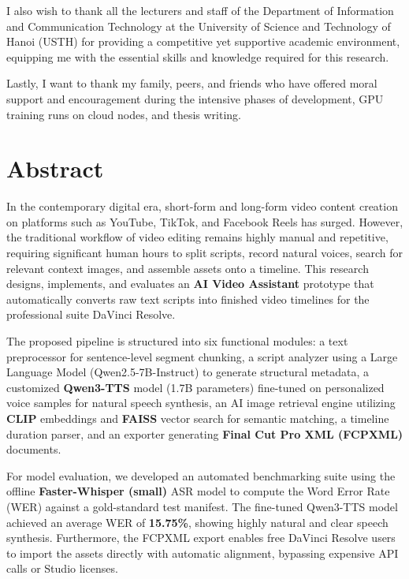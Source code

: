 \documentclass[a4paper,12pt]{report}
\begin{document}
I also wish to thank all the lecturers and staff of the Department of Information and Communication Technology at the University of Science and Technology of Hanoi (USTH) for providing a competitive yet supportive academic environment, equipping me with the essential skills and knowledge required for this research.

Lastly, I want to thank my family, peers, and friends who have offered moral support and encouragement during the intensive phases of development, GPU training runs on cloud nodes, and thesis writing.
\newpage

\chapter*{Abstract}
In the contemporary digital era, short-form and long-form video content creation on platforms such as YouTube, TikTok, and Facebook Reels has surged. However, the traditional workflow of video editing remains highly manual and repetitive, requiring significant human hours to split scripts, record natural voices, search for relevant context images, and assemble assets onto a timeline. This research designs, implements, and evaluates an \textbf{AI Video Assistant} prototype that automatically converts raw text scripts into finished video timelines for the professional suite DaVinci Resolve.

The proposed pipeline is structured into six functional modules: a text preprocessor for sentence-level segment chunking, a script analyzer using a Large Language Model (Qwen2.5-7B-Instruct) to generate structural metadata, a customized \textbf{Qwen3-TTS} model (1.7B parameters) fine-tuned on personalized voice samples for natural speech synthesis, an AI image retrieval engine utilizing \textbf{CLIP} embeddings and \textbf{FAISS} vector search for semantic matching, a timeline duration parser, and an exporter generating \textbf{Final Cut Pro XML (FCPXML)} documents. 

For model evaluation, we developed an automated benchmarking suite using the offline \textbf{Faster-Whisper (small)} ASR model to compute the Word Error Rate (WER) against a gold-standard test manifest. The fine-tuned Qwen3-TTS model achieved an average WER of \textbf{15.75\%}, showing highly natural and clear speech synthesis. Furthermore, the FCPXML export enables free DaVinci Resolve users to import the assets directly with automatic alignment, bypassing expensive API calls or Studio licenses.
\newpage
\end{document}
